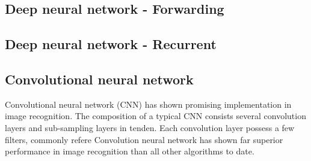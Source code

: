 \subsection{Deep neural network - Forwarding}
\subsection{Deep neural network - Recurrent}
\subsection{Convolutional neural network}
Convolutional neural network (CNN) has shown promising implementation in image recognition. The composition of a typical CNN consists several convolution layers and sub-sampling layers in tenden. Each convolution layer possess a few filters, commonly refere 
Convolution neural network has shown far superior performance in image recognition than all other algorithms to date.~\cite{Szegedy_2015}